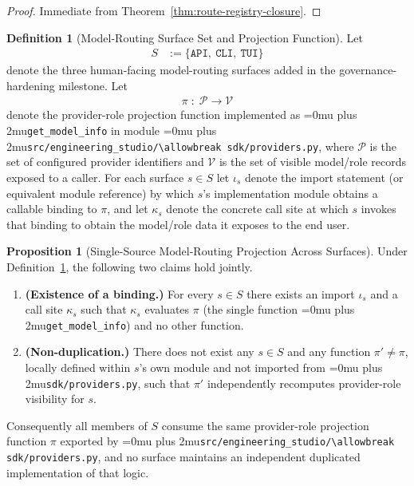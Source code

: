 \documentclass[12pt]{article}
\theoremstyle{definition}
\newtheorem{definition}[theorem]{Definition}
\newtheorem{proposition}[theorem]{Proposition}
\DeclareRobustCommand{\code}[1]{\begingroup\Urlmuskip=0mu plus 2mu\relax\nolinkurl{#1}\endgroup}
\begin{document}
\begin{proof}
Immediate from Theorem~\ref{thm:route-registry-closure}.
\end{proof}

\begin{definition}[Model-Routing Surface Set and Projection Function]
\label{def:model-routing-surfaces}
Let
\begin{align}
  S &:= \{\texttt{API},\ \texttt{CLI},\ \texttt{TUI}\}
\end{align}
denote the three human-facing model-routing surfaces added in the
governance-hardening milestone. Let
\begin{align}
  \pi \;:\; \mathcal{P} \to \mathcal{V}
\end{align}
denote the provider-role projection function implemented as
\code{get\_model\_info} in module
\code{src/engineering\_studio/\allowbreak sdk/providers.py}, where
$\mathcal{P}$ is the set of configured provider identifiers and
$\mathcal{V}$ is the set of visible model/role records exposed to a
caller. For each surface $s \in S$ let $\iota_s$ denote the import
statement (or equivalent module reference) by which $s$'s
implementation module obtains a callable binding to $\pi$, and let
$\kappa_s$ denote the concrete call site at which $s$ invokes that
binding to obtain the model/role data it exposes to the end user.
\end{definition}

\begin{proposition}[Single-Source Model-Routing Projection Across Surfaces]
\label{prop:single-source-model-routing}
Under Definition~\ref{def:model-routing-surfaces}, the following two
claims hold jointly.
\begin{enumerate}
  \item \textbf{(Existence of a binding.)} For every $s \in S$ there
  exists an import $\iota_s$ and a call site $\kappa_s$ such that
  $\kappa_s$ evaluates $\pi$ (the single function
  \code{get\_model\_info}) and no other function.

  \item \textbf{(Non-duplication.)} There does not exist any $s \in S$
  and any function $\pi' \neq \pi$, locally defined within $s$'s own
  module and not imported from \code{sdk/providers.py}, such that
  $\pi'$ independently recomputes provider-role visibility for $s$.
\end{enumerate}
Consequently all members of $S$ consume the same provider-role
projection function $\pi$ exported by
\code{src/engineering\_studio/\allowbreak sdk/providers.py}, and no
surface maintains an independent duplicated implementation of that
logic.
\end{proposition}
\end{document}
